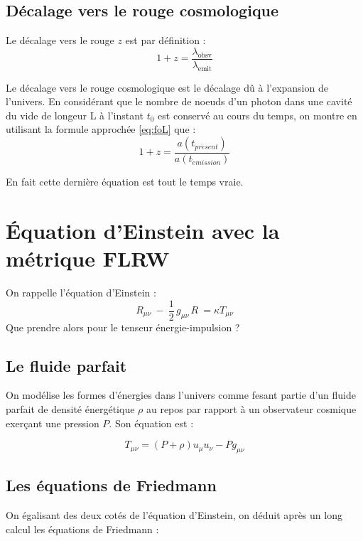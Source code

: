 \documentclass[10pt, a4paper]{report}
\numberwithin{equation}{subsection}
\begin{document}
\subsection{Décalage vers le rouge cosmologique}
Le décalage vers le rouge $z$ est par définition : 
\begin{equation}
\boxed{1+z = \frac{\lambda_{\mathrm{obsv}}}{\lambda_{\mathrm{emit}}}}
\end{equation}

Le décalage vers le rouge cosmologique est le décalage dû à l'expansion de l'univers. En considérant que le nombre de noeuds d'un photon dans une cavité du vide de longeur L à l'instant $t_0$ est conservé au cours du temps, on montre en utilisant la formule approchée \ref{eq:foL} que :
\begin{equation} \label{eq:zC}
\boxed{1+z = \frac{a(t_{pr\acute esent})}{a(t_{\acute emission})}}
\end{equation}

En fait cette dernière équation est tout le temps vraie.

\section{\uppercase{é}quation d'Einstein avec la métrique FLRW}
On rappelle l'équation d'Einstein :
\begin{equation} \label{eq:EFE}
\boxed{R_{\mu \nu} \ - \ \frac{1}{2} \, g_{\mu \nu} \, R  \  =  \kappa T_{\mu \nu}}
\end{equation}
Que prendre alors pour le tenseur énergie-impulsion ?
\subsection{Le fluide parfait}
On modélise les formes d'énergies dans l'univers comme fesant partie d'un fluide parfait de densité énergétique $\rho$ au repos par rapport à un observateur cosmique exerçant une pression $P$. Son équation est : 

\begin{equation} \label{eq:FP}
\boxed{T_{\mu\nu} = (P + \rho) u_\mu u_\nu - P g_{\mu\nu}}
\end{equation}

\subsection{Les équations de Friedmann}
On égalisant des deux cotés de l'équation d'Einstein, on déduit après un long calcul les équations de Friedmann :
\end{document}
